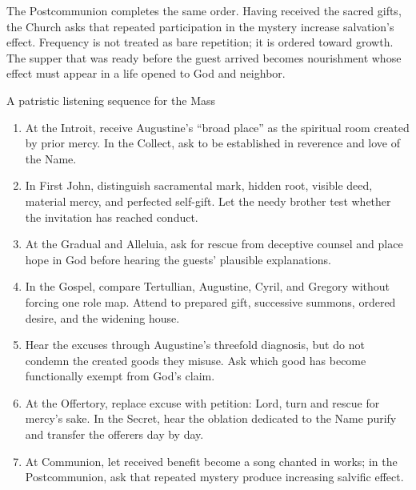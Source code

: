 \begin{deepstudy}
The Postcommunion completes the same order. Having received the sacred gifts, the Church asks that repeated participation in the mystery increase salvation's effect. Frequency is not treated as bare repetition; it is ordered toward growth. The supper that was ready before the guest arrived becomes nourishment whose effect must appear in a life opened to God and neighbor.

\newpage
\begin{massbox}{A patristic listening sequence for the Mass}
\begin{enumerate}[leftmargin=1.45em,itemsep=0.2em]
\item At the Introit, receive Augustine's ``broad place'' as the spiritual room created by prior mercy. In the Collect, ask to be established in reverence and love of the Name.
\item In First John, distinguish sacramental mark, hidden root, visible deed, material mercy, and perfected self-gift. Let the needy brother test whether the invitation has reached conduct.
\item At the Gradual and Alleluia, ask for rescue from deceptive counsel and place hope in God before hearing the guests' plausible explanations.
\item In the Gospel, compare Tertullian, Augustine, Cyril, and Gregory without forcing one role map. Attend to prepared gift, successive summons, ordered desire, and the widening house.
\item Hear the excuses through Augustine's threefold diagnosis, but do not condemn the created goods they misuse. Ask which good has become functionally exempt from God's claim.
\item At the Offertory, replace excuse with petition: Lord, turn and rescue for mercy's sake. In the Secret, hear the oblation dedicated to the Name purify and transfer the offerers day by day.
\item At Communion, let received benefit become a song chanted in works; in the Postcommunion, ask that repeated mystery produce increasing salvific effect.
\end{enumerate}
\end{massbox}


\end{deepstudy}
